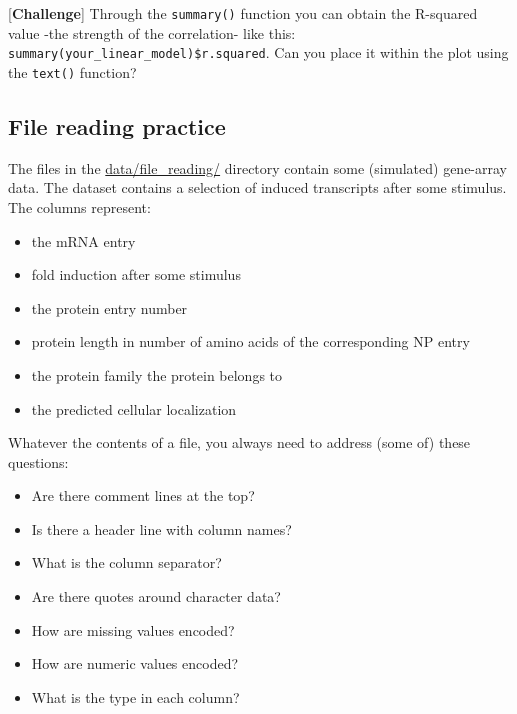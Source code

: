 \documentclass[]{book}
\providecommand{\tightlist}{%
  \setlength{\itemsep}{0pt}\setlength{\parskip}{0pt}}
\begin{document}
{[}\textbf{Challenge}{]} Through the \texttt{summary()} function you can obtain the R-squared value -the strength of the correlation- like this: \texttt{summary(your\_linear\_model)\$r.squared}. Can you place it within the plot using the \texttt{text()} function?

\hypertarget{file-reading-practice}{%
\subsection{File reading practice}\label{file-reading-practice}}

The files in the \url{data/file_reading/} directory contain some (simulated) gene-array data. The dataset contains a selection of induced transcripts after some stimulus. The columns represent:

\begin{itemize}
\tightlist
\item
  the mRNA entry\\
\item
  fold induction after some stimulus\\
\item
  the protein entry number\\
\item
  protein length in number of amino acids of the corresponding NP entry\\
\item
  the protein family the protein belongs to\\
\item
  the predicted cellular localization
\end{itemize}

Whatever the contents of a file, you always need to address (some of) these questions:

\begin{itemize}
\tightlist
\item
  Are there comment lines at the top?\\
\item
  Is there a header line with column names?\\
\item
  What is the column separator?\\
\item
  Are there quotes around character data?\\
\item
  How are missing values encoded?\\
\item
  How are numeric values encoded?\\
\item
  What is the type in each column?
\end{itemize}
\end{document}
